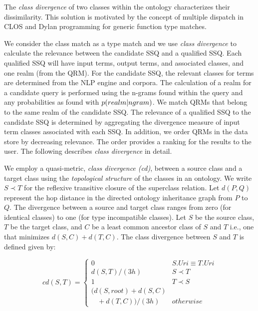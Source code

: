 The \emph{class divergence} of two classes within the ontology characterizes their dissimilarity.  This solution is motivated by the concept of multiple dispatch in CLOS and Dylan programming for generic function type matches. 

We consider the class match as a type match and we use \emph{class divergence} to calculate the relevance between the candidate SSQ and a qualified SSQ. Each qualified SSQ will have input terms, output terms, and associated classes, and one realm (from the QRM).  For the candidate SSQ, the relevant classes for terms are determined from the NLP engine and corpora. The calculation of a realm for a candidate query is performed using the n-grams found within the query and any probabilities as found with $p(realm|n\-gram)$. %
We match QRMs that belong to the same realm of the candidate SSQ. The relevance of a qualified SSQ to the candidate SSQ is determined by aggregating the divergence measure of input term classes associated with each SSQ. In addition, we order QRMs in the data store 
by decreasing relevance. The order provides a ranking for the results 
to the user. The following describes \emph{class divergence} 
in detail.


We employ a quasi-metric, \textit{class divergence (cd)}, between a source class and a target class using the \textit{topological structure} of the classes in an ontology. We write $S \prec T$ for the reflexive transitive closure of the superclass relation. Let $d(P,Q)$ represent the hop distance in the directed ontology inheritance graph from $P$ to $Q$. The divergence between a source and target class ranges from zero (for identical classes) to one (for type incompatible classes). Let $S$ be the source class, $T$ be the target class, and $C$ be a least common ancestor class of $S$ and $T$ i.e., one that minimizes $d(S,C) + d(T,C)$. The class divergence between $S$ and $T$ is defined given by:

\begin{equation}
cd(S, T) = \begin{cases}
0 & S.{Uri} \equiv T.{Uri}\\
d(S, T)/(3h) & S \prec T\\
1 & T \prec S\\
(d(S,root) + d(S,C) \\ \ \ \ \ + d(T,C))/(3h) & otherwise
\end{cases}
\end{equation}


